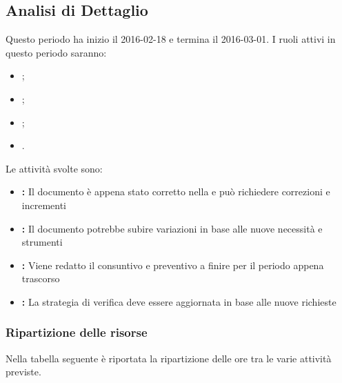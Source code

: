 \documentclass[12pt,a4paper]{article}
\begin{document}
\newpage

\subsection{Analisi di Dettaglio}
Questo periodo ha inizio il 2016-02-18 e termina il 2016-03-01. I ruoli attivi in questo periodo saranno:

\begin{itemize}
	\item \AM{};
	\item \AN{};
	\item \RE{};
	\item \VR{}.
\end{itemize}

Le attività svolte sono:

\begin{itemize}
	\item \textbf{\AdR{}:} 
	Il documento è appena stato corretto nella \RR{} e può richiedere correzioni e incrementi
	\item \textbf{\NdP{}:}
	Il documento potrebbe subire variazioni in base alle nuove necessità e strumenti
	\item \textbf{\PdP{}:} Viene redatto il consuntivo e preventivo a finire per il periodo appena trascorso
	\item \textbf{\PdQ{}:}
		La strategia di verifica deve essere aggiornata in base alle nuove richieste
\end{itemize}

\newpage
\subsubsection{Ripartizione delle risorse}
Nella tabella seguente è riportata la ripartizione delle ore tra le varie attività previste.
\end{document}

